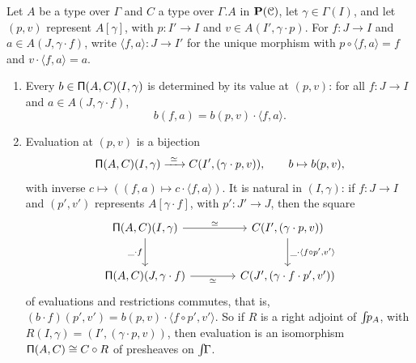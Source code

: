 \begin{lemma}[Binding]\label{lem:binding}
    Let $A$ be a type over $\Gamma$ and $C$ a type over $\Gamma.A$ in $\mathbf{P}(\mathcal{C})$, let $\gamma \in \Gamma(I)$, and let $(p, v)$ represent $A[\gamma]$, with $p : I' \to I$ and $v \in A(I', \gamma \cdot p)$. For $f : J \to I$ and $a \in A(J, \gamma \cdot f)$, write $\langle f, a \rangle : J \to I'$ for the unique morphism with $p \circ \langle f, a \rangle = f$ and $v \cdot \langle f, a \rangle = a$.
    \begin{enumerate}
        \item Every $b \in \mathsf{\Pi}(A, C)(I, \gamma)$ is determined by its value at $(p, v)$: for all $f : J \to I$ and $a \in A(J, \gamma \cdot f)$,
        \[
            b(f, a) = b(p, v) \cdot \langle f, a \rangle.
        \]
        \item Evaluation at $(p, v)$ is a bijection
        \[
            \mathsf{\Pi}(A, C)(I, \gamma) \xrightarrow{\ \simeq\ } C(I', (\gamma \cdot p, v)), \qquad b \mapsto b(p, v),
        \]
        with inverse $c \mapsto ((f, a) \mapsto c \cdot \langle f, a \rangle)$. It is natural in $(I, \gamma)$: if $f : J \to I$ and $(p', v')$ represents $A[\gamma \cdot f]$, with $p' : J' \to J$, then the square
        \[\begin{tikzcd}[column sep=4em, row sep=2.5em]
            {\PiT(A, C)(I, \gamma)} & {C(I', (\gamma \cdot p, v))} \\
            {\PiT(A, C)(J, \gamma \cdot f)} & {C(J', (\gamma \cdot f \cdot p', v'))}
            \arrow["\simeq", from=1-1, to=1-2]
            \arrow["{\_ \cdot f}"', from=1-1, to=2-1]
            \arrow["{\_ \cdot \langle f \circ p', v' \rangle}", from=1-2, to=2-2]
            \arrow["\simeq"', from=2-1, to=2-2]
        \end{tikzcd}\]
        of evaluations and restrictions commutes, that is, $(b \cdot f)(p', v') = b(p, v) \cdot \langle f \circ p', v' \rangle$. So if $R$ is a right adjoint of $\int\!\!p_A$, with $R(I, \gamma) = (I', (\gamma \cdot p, v))$, then evaluation is an isomorphism $\mathsf{\Pi}(A, C) \cong C \circ R$ of presheaves on $\int\!\!\Gamma$.
    \end{enumerate}
\end{lemma}

